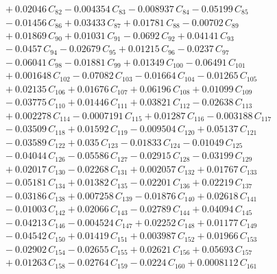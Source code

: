 \documentclass[a4paper,11pt]{article}
\begin{document}
\begin{align}
&\quad + 0.02046\,C_{82} - 0.004354\,C_{83} - 0.008937\,C_{84} - 0.05199\,C_{85} \nonumber\\
&\quad - 0.01456\,C_{86} + 0.03433\,C_{87} + 0.01781\,C_{88} - 0.00702\,C_{89} \nonumber\\
&\quad + 0.01869\,C_{90} + 0.01031\,C_{91} - 0.0692\,C_{92} + 0.04141\,C_{93} \nonumber\\
&\quad - 0.0457\,C_{94} - 0.02679\,C_{95} + 0.01215\,C_{96} - 0.0237\,C_{97} \nonumber\\
&\quad - 0.06041\,C_{98} - 0.01881\,C_{99} + 0.01349\,C_{100} - 0.06491\,C_{101} \nonumber\\
&\quad + 0.001648\,C_{102} - 0.07082\,C_{103} - 0.01664\,C_{104} - 0.01265\,C_{105} \nonumber\\
&\quad + 0.02135\,C_{106} + 0.01676\,C_{107} + 0.06196\,C_{108} + 0.01099\,C_{109} \nonumber\\
&\quad - 0.03775\,C_{110} + 0.01446\,C_{111} + 0.03821\,C_{112} - 0.02638\,C_{113} \nonumber\\
&\quad + 0.002278\,C_{114} - 0.0007191\,C_{115} + 0.01287\,C_{116} - 0.003188\,C_{117} \nonumber\\
&\quad - 0.03509\,C_{118} + 0.01592\,C_{119} - 0.009504\,C_{120} + 0.05137\,C_{121} \nonumber\\
&\quad - 0.03589\,C_{122} + 0.035\,C_{123} - 0.01833\,C_{124} - 0.01049\,C_{125} \nonumber\\
&\quad - 0.04044\,C_{126} - 0.05586\,C_{127} - 0.02915\,C_{128} - 0.03199\,C_{129} \nonumber\\
&\quad + 0.02017\,C_{130} - 0.02268\,C_{131} + 0.002057\,C_{132} + 0.01767\,C_{133} \nonumber\\
&\quad - 0.05181\,C_{134} + 0.01382\,C_{135} - 0.02201\,C_{136} + 0.02219\,C_{137} \nonumber\\
&\quad - 0.03186\,C_{138} + 0.007258\,C_{139} - 0.01876\,C_{140} + 0.02618\,C_{141} \nonumber\\
&\quad - 0.01003\,C_{142} + 0.02066\,C_{143} - 0.02789\,C_{144} + 0.04094\,C_{145} \nonumber\\
&\quad - 0.04213\,C_{146} - 0.004524\,C_{147} + 0.02252\,C_{148} + 0.01177\,C_{149} \nonumber\\
&\quad - 0.04542\,C_{150} + 0.01419\,C_{151} + 0.003987\,C_{152} + 0.01966\,C_{153} \nonumber\\
&\quad - 0.02902\,C_{154} - 0.02655\,C_{155} + 0.02621\,C_{156} + 0.05693\,C_{157} \nonumber\\
&\quad + 0.01263\,C_{158} - 0.02764\,C_{159} - 0.0224\,C_{160} + 0.0008112\,C_{161} \nonumber\\

\end{align}
\end{document}

